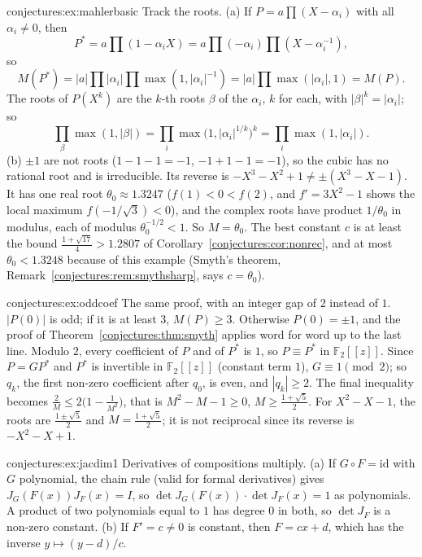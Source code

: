 \begin{solution}{conjectures:ex:mahlerbasic}
\idea Track the roots.
\writeup (a) If $P=a\prod(X-\alpha_i)$ with all $\alpha_i\ne0$, then
\[
P^*=a\prod(1-\alpha_iX)=a\prod(-\alpha_i)\prod(X-\alpha_i^{-1}),
\]
so
\[
M(P^*)=|a|\prod|\alpha_i|\prod\max(1,|\alpha_i|^{-1})=|a|\prod\max(|\alpha_i|,1)=M(P).
\]
The roots of $P(X^k)$ are the $k$-th roots $\beta$ of the $\alpha_i$, $k$ for each, with $|\beta|^k=|\alpha_i|$; so
\[
\prod_\beta\max(1,|\beta|)=\prod_i\max\bigl(1,|\alpha_i|^{1/k}\bigr)^k=\prod_i\max(1,|\alpha_i|).
\]
(b) $\pm1$ are not roots ($1-1-1=-1$, $-1+1-1=-1$), so the cubic has no rational root and is irreducible. Its reverse is $-X^3-X^2+1\ne\pm(X^3-X-1)$. It has
one real root $\theta_0\approx1.3247$ ($f(1)<0<f(2)$, and $f'=3X^2-1$ shows the local maximum $f(-1/\sqrt3)<0$), and the complex roots have product
$1/\theta_0$ in modulus, each of modulus $\theta_0^{-1/2}<1$. So $M=\theta_0$. The best constant $c$ is at least the bound $\frac{1+\sqrt{17}}4>1.2807$ of
Corollary~\ref{conjectures:cor:nonrec}, and at most $\theta_0<1.3248$ because of this example (Smyth's theorem, Remark~\ref{conjectures:rem:smythsharp}, says $c=\theta_0$).
\end{solution}

\begin{solution}{conjectures:ex:oddcoef}
\idea The same proof, with an integer gap of $2$ instead of $1$.
\writeup $|P(0)|$ is odd; if it is at least $3$, $M(P)\ge3$. Otherwise $P(0)=\pm1$, and the proof of Theorem~\ref{conjectures:thm:smyth} applies word for word up to
the last line. Modulo $2$, every coefficient of $P$ and of $P^*$ is $1$, so $P\equiv P^*$ in $\mathbb F_2[[z]]$. Since $P=GP^*$ and $P^*$ is invertible in
$\mathbb F_2[[z]]$ (constant term $1$), $G\equiv1\pmod2$; so $q_k$, the first non-zero coefficient after $q_0$, is even, and $|q_k|\ge2$. The final inequality becomes
$\frac2M\le2\bigl(1-\frac1{M^2}\bigr)$, that is $M^2-M-1\ge0$, $M\ge\frac{1+\sqrt5}2$. For $X^2-X-1$, the roots are $\frac{1\pm\sqrt5}2$ and
$M=\frac{1+\sqrt5}2$; it is not reciprocal since its reverse is $-X^2-X+1$.
\end{solution}

\begin{solution}{conjectures:ex:jacdim1}
\idea Derivatives of compositions multiply.
\writeup (a) If $G\circ F=\mathrm{id}$ with $G$ polynomial, the chain rule (valid for formal derivatives) gives $J_G(F(x))J_F(x)=I$, so
$\det J_G(F(x))\cdot\det J_F(x)=1$ as polynomials. A product of two polynomials equal to $1$ has degree $0$ in both, so $\det J_F$ is a non-zero constant.
(b) If $F'=c\ne0$ is constant, then $F=cx+d$, which has the inverse $y\mapsto(y-d)/c$.
\end{solution}

